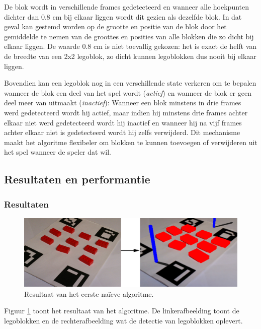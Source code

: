 De blok wordt in verschillende frames gedetecteerd en wanneer alle hoekpunten dichter dan 0.8 cm bij elkaar liggen wordt dit gezien als dezelfde blok. In dat geval kan gestemd worden op de grootte en positie van de blok door het gemiddelde te nemen van de groottes en posities van alle blokken die zo dicht bij elkaar liggen. De waarde 0.8 cm is niet toevallig gekozen: het is exact de helft van de breedte van een 2x2 legoblok, zo dicht kunnen legoblokken dus nooit bij elkaar liggen.

Bovendien kan een legoblok nog in een verschillende state verkeren om te bepalen wanneer de blok een deel van het spel wordt (\textit{actief}) en wanneer de blok er geen deel meer van uitmaakt (\textit{inactief}): Wanneer een blok minstens in drie frames werd gedetecteerd wordt hij actief, maar indien hij minstens drie frames achter elkaar niet werd gedetecteerd wordt hij inactief en wanneer hij na vijf frames achter elkaar niet is gedetecteerd wordt hij zelfs verwijderd. Dit mechanisme maakt het algoritme flexibeler om blokken te kunnen toevoegen of verwijderen uit het spel wanneer de speler dat wil.

\subsection{Resultaten en performantie} \label{sec:algo1_res}

\subsubsection*{Resultaten}

\begin{figure}
  \centering
  \includegraphics[width=\linewidth]{img/alg1}
  \caption{Resultaat van het eerste na\"ieve algoritme.}
  \label{fig:result_algo1}
\end{figure}


Figuur \ref{fig:result_algo1} toont het resultaat van het algoritme. De linkerafbeelding toont de legoblokken en de rechterafbeelding wat de detectie van legoblokken oplevert. 

